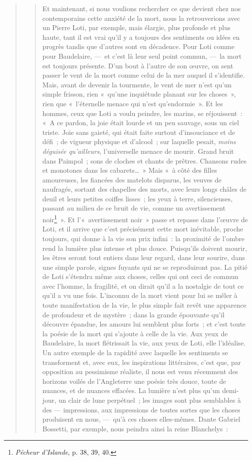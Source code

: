 \documentclass[french,twoside]{book} %
\begin{document}
\begin{verse}
\begin{verse}
\noindent Et maintenant, si nous voulions rechercher ce que devient chez nos contemporains cette anxiété de la mort, nous la retrouverions avec un Pierre Loti, par exemple, mais élargie, plus profonde et plus haute, tant il est vrai qu’il y a toujours des sentiments ou idées en progrès tandis que d’autres sont en décadence. Pour Loti comme pour Baudelaire, — et c’est là leur seul point commun, — la mort est toujours présente. D’un bout à l’autre de son œuvre, on sent passer le vent de la mort comme celui de la mer auquel il s’identifie. Mais, avant de devenir la tourmente, le vent de mer n’est qu’un simple frisson, rien « qu’une inquiétude planant sur les choses », rien que « l’éternelle menace qui n’est qu’endormie ». Et les hommes, ceux que Loti a voulu peindre, les marins, se réjouissent : « A ce pardon, la joie était lourde et un peu sauvage, sous un ciel triste. Joie sans gaieté, qui était faite surtout d’insouciance et de défi ; de vigueur physique et d’alcool ; sur laquelle pesait, \emph{moins déguisée qu’ailleurs}, l’universelle menace de mourir. Grand bruit dans Paimpol ; sons de cloches et chants de prêtres. Chansons rudes et monotones dans les cabarets… » Mais « à côté des filles amoureuses, les fiancées des matelots disparus, les veuves de naufragés, sortant des chapelles des morts, avec leurs longs châles de deuil et leurs petites coiffes lisses ; les yeux à terre, silencieuses, passant au milieu de ce bruit de vie, comme un avertissement noir\footnote{\emph{Pécheur d’Islande}, p. 38, 39, 40.} ». Et l’« avertissement noir » passe et repasse dans l’œuvre de Loti, et il arrive que c’est précisément cette mort inévitable, proche toujours, qui donne à la vie son prix infini : la proximité de l’ombre rend la lumière plus intense et plus douce. Puisqu’ils doivent mourir, les êtres seront tout entiers dans leur regard, dans leur sourire, dans une simple parole, signes fuyants qui ne se reproduiront pas. La pitié de Loti s’étendra même aux choses, celles qui ont ceci de commun avec l’homme, la fragilité, et on dirait qu’il a la nostalgie de tout ce qu’il a vu une fois. L’inconnu de la mort vient pour lui se mêler à toute manifestation de la vie, le plus simple fait revêt une apparence de profondeur et de mystère ; dans la grande épouvante qu’il découvre épandue, les amours lui semblent plus forts ; et c’est toute la poésie de la mort qui s’ajoute à celle de la vie. Aux yeux de Baudelaire, la mort flétrissait la vie, aux yeux de Loti, elle l’idéalise. Un autre exemple de la rapidité avec laquelle les sentiments se transforment et, avec eux, les inspirations littéraires, c’est que, par opposition au pessimisme réaliste, il nous est venu récemment des horizons voilés de l’Angleterre une poésie très douce, toute de nuances, et de nuances effacées. La lumière n’est plus qu’un demi-jour, un clair de lune perpétuel ; les images sont plus semblables à des — impressions, aux impressions de toutes sortes que les choses produisent en nous, — qu’à ces choses elles-mêmes. Dante Gabriel Bossetti, par exemple, nous peindra ainsi la reine Blanchelys :\par



\end{verse}
\end{verse}
\end{document}
